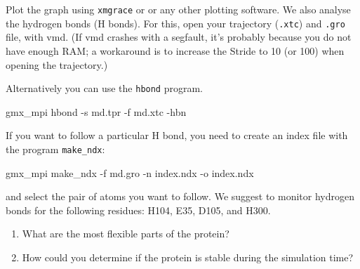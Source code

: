 \documentclass[10pt]{article}
\begin{document}
Plot the graph using \texttt{xmgrace} or  or any other plotting software. We also analyse the hydrogen bonds (H bonds). For this, open your trajectory (\texttt{.xtc}) and \texttt{.gro} file, with vmd. (If vmd crashes with a segfault, it's probably because you do not have enough RAM; a workaround is to increase the Stride to 10 (or 100) when opening the trajectory.)

Alternatively you can use the \texttt{hbond} program. 
\begin{cmdline}
gmx_mpi hbond -s md.tpr -f md.xtc -hbn
\end{cmdline}


If you want to follow a particular H bond, you need to create an index file with the program \texttt{make\_ndx}:

\begin{cmdline}
gmx_mpi make_ndx -f md.gro -n index.ndx -o index.ndx
\end{cmdline}

and select the pair of atoms you want to follow. We suggest to monitor hydrogen bonds for the following residues: H104, E35, D105, and H300. 

\begin{question}
    \begin{enumerate}[leftmargin=0.8cm]
        \renewcommand{\labelenumi}{Q\arabic{enumi}.}
        \setcounter{enumi}{9}
        \item What are the most flexible parts of the protein?
        \item How could you determine if the protein is stable during the simulation time?
    \end{enumerate}
\end{question}

\printbibliography
\end{document}
